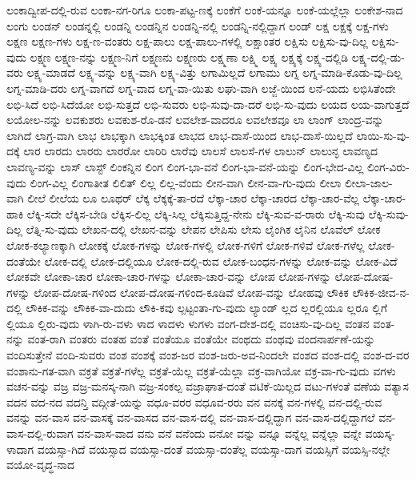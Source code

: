 {ಲಂಕಾದ್ವೀಪ-ದಲ್ಲಿ-ರುವ
ಲಂಕಾ-ನಗ-ರಿಗೂ
ಲಂಕಾ-ಪಟ್ಟ-ಣಕ್ಕೆ
ಲಂಕೆಗೆ
ಲಂಕೆ-ಯನ್ನೂ
ಲಂಕೆ-ಯಲ್ಲೆಲ್ಲಾ
ಲಂಕೇಶ-ನಾದ
ಲಂಗು
ಲಂಡನ್
ಲಂಡನ್ನಲ್ಲಿ
ಲಂಡನ್ನಿ
ಲಂಡನ್ನಿನ
ಲಂಡನ್ನಿ-ನಲ್ಲಿ
ಲಂಡನ್ನಿ-ನಲ್ಲಿದ್ದಾಗ
ಲಂಡ್
ಲಕ್ಷ
ಲಕ್ಷಕ್ಕೆ
ಲಕ್ಷ-ಗಳು
ಲಕ್ಷಣ
ಲಕ್ಷಣ-ಗಳು
ಲಕ್ಷ-ಣ-ವಂತರು
ಲಕ್ಷ-ಪಾಲು
ಲಕ್ಷ-ಪಾಲು-ಗಳಲ್ಲಿ
ಲಕ್ಷಾಂತರ
ಲಕ್ಷಿಸು
ಲಕ್ಷಿಸು-ವು-ದಿಲ್ಲ
ಲಕ್ಷಿಸು-ವುದು
ಲಕ್ಷ್ಮಣ
ಲಕ್ಷ್ಮಣ-ನನ್ನು
ಲಕ್ಷ್ಮಣ-ನಿಗೆ
ಲಕ್ಷ್ಮಣನು
ಲಕ್ಷ್ಮಣರು
ಲಕ್ಷ್ಮಣಾ
ಲಕ್ಷ್ಮಿ
ಲಕ್ಷ್ಯ
ಲಕ್ಷ್ಯಕ್ಕೆ
ಲಕ್ಷ್ಯ-ದಲ್ಲಿಡಿ
ಲಕ್ಷ್ಯ-ದಲ್ಲಿ-ಡು-ವರು
ಲಕ್ಷ್ಯ-ಮಾಡದೆ
ಲಕ್ಷ್ಯ-ವನ್ನು
ಲಕ್ಷ್ಯ-ವಾಗಿ
ಲಕ್ಷ್ಯ-ವಿತ್ತು
ಲಗಾಮಿಲ್ಲದೆ
ಲಗಾಮು
ಲಗ್ನ
ಲಗ್ನ-ಮಾಡಿ-ಕೊಡು-ವು-ದಿಲ್ಲ
ಲಗ್ನ-ಮಾಡಿ-ದರು
ಲಗ್ನ-ವಾಗದೆ
ಲಗ್ನ-ವಾದ
ಲಗ್ನ-ವಾ-ಯಿತು
ಲಘು-ವಾಗಿ
ಲಜ್ಜೆ-ಯಿಂದ
ಲನೆ-ಯದು
ಲಭಿಸಿತೆಂದೇ
ಲಭಿ-ಸಿದೆ
ಲಭಿ-ಸಿದೆಯೋ
ಲಭಿ-ಸುತ್ತದೆ
ಲಭಿ-ಸುವರು
ಲಭಿ-ಸುವು-ದಾ-ದರೆ
ಲಭಿ-ಸು-ವುದು
ಲಯದ
ಲಯ-ವಾಗುತ್ತದೆ
ಲಯೋಲ-ನನ್ನು
ಲವಕುಶರು
ಲವಕುಶ-ರೊ-ಡನೆ
ಲವಲೇಶ-ವಾದರೂ
ಲವಲೇಶವೂ
ಲಾ
ಲಾಂಗ್
ಲಾಂದ್ರ-ವನ್ನು
ಲಾಗಿದೆ
ಲಾಗ್ರ-ವಾಗಿ
ಲಾಭ
ಲಾಭಕ್ಕಾಗಿ
ಲಾಭಕ್ಕಿಂತ
ಲಾಭದ
ಲಾಭ-ದಾಸೆ-ಯಿಂದ
ಲಾಭ-ದಾಸೆ-ಯಿಲ್ಲದೆ
ಲಾಯಿ-ಸು-ವು-ದಕ್ಕೆ
ಲಾರ
ಲಾರದು
ಲಾರರು
ಲಾರರೋ
ಲಾರಿರಿ
ಲಾರೆವು
ಲಾಲಸೆ
ಲಾಲಸೆ-ಗಳ
ಲಾಲುನ್
ಲಾಲುನ್ಳ
ಲಾವಣ್ಯದ
ಲಾವಣ್ಯ-ವನ್ನು
ಲಾಸ್
ಲಾಸ್ಟ್
ಲಿಂಕನ್ನಿನ
ಲಿಂಗ
ಲಿಂಗ-ಭಾ-ವನೆ
ಲಿಂಗ-ಭಾ-ವನೆ-ಯನ್ನು
ಲಿಂಗ-ಭೇದ-ವಿಲ್ಲ
ಲಿಂಗ-ವಿರು-ವುದು
ಲಿಂಗ-ವಿಲ್ಲ
ಲಿಂಗಾತೀತ
ಲಿಲಿತ್
ಲಿಲ್ಲ
ಲಿಲ್ಲ-ವೆಂದು
ಲೀನ-ವಾಗಿ
ಲೀನ-ವಾ-ಗು-ವುದು
ಲೀಲಾ
ಲೀಲಾ-ಜಾಲ-ವಾಗಿ
ಲೀಲೆ
ಲೀಲೆಯ
ಲೂ
ಲೂಥರ್
ಲೆಕ್ಕ
ಲೆಕ್ಕಕ್ಕೆ-ತಾ-ರದೆ
ಲೆಕ್ಕಾ-ಚಾರ
ಲೆಕ್ಕಾ-ಚಾರದ
ಲೆಕ್ಕಾ-ಚಾರ-ವೆಲ್ಲ
ಲೆಕ್ಕಾ-ಚಾರ-ಹಾಕಿ
ಲೆಕ್ಕಿ-ಸದೇ
ಲೆಕ್ಕಿಸ-ಬೇಡಿ
ಲೆಕ್ಕಿಸ-ಲಿಲ್ಲ
ಲೆಕ್ಕಿ-ಸಿಲ್ಲ
ಲೆಕ್ಕಿಸುತ್ತಿದ್ದ-ನೇನು
ಲೆಕ್ಕಿ-ಸುವ-ವ-ರಾರು
ಲೆಕ್ಕಿ-ಸುವು
ಲೆಕ್ಕಿ-ಸುವು-ದಿಲ್ಲ
ಲೆತ್ನಿ-ಸು-ವುದು
ಲೇಖನ-ದಲ್ಲಿ
ಲೇಖನ-ವನ್ನು
ಲೇಪನ
ಲೇಪಿಸು
ಲೇಸು
ಲೈಂಗಿಕ
ಲೈನಿನ
ಲೊವೆಲ್
ಲೋಕ
ಲೋಕ-ಕಲ್ಯಾಣಕ್ಕಾಗಿ
ಲೋಕಕ್ಕೆ
ಲೋಕ-ಗಳನ್ನು
ಲೋಕ-ಗಳಲ್ಲಿ
ಲೋಕ-ಗಳಿಗೆ
ಲೋಕ-ಗಳಿವೆ
ಲೋಕ-ಗಳೆಲ್ಲ
ಲೋಕ-ದಂತೆಯೇ
ಲೋಕ-ದಲ್ಲಿ
ಲೋಕ-ದಲ್ಲಿಯೂ
ಲೋಕ-ದಲ್ಲಿ-ರುವ
ಲೋಕ-ಬಂಧನ-ಗಳನ್ನು
ಲೋಕ-ವನ್ನು
ಲೋಕ-ವಿದೆ
ಲೋಕವೇ
ಲೋಕಾ-ಚಾರ
ಲೋಕಾ-ಚಾರ-ಗಳನ್ನು
ಲೋಕಾ-ಚಾರ-ವನ್ನು
ಲೋಪ
ಲೋಪ-ಗಳನ್ನು
ಲೋಪ-ದೋಷ-ಗಳನ್ನು
ಲೋಪ-ದೋಷ-ಗಳಿಂದ
ಲೋಪ-ದೋಷ-ಗಳಿಂದ-ಕೂಡಿವೆ
ಲೋಪ-ವನ್ನು
ಲೋಹವು
ಲೌಕಿಕ
ಲೌಕಿಕ-ಜೀವ-ನ-ದಲ್ಲಿ
ಲೌಕಿಕ-ವನ್ನು
ಲೌಕಿಕ-ವಾ-ದುದು
ಲೌಕಿ-ಕವು
ಲ್ಪಟ್ಟಂತಾ-ಗು-ವುದು
ಲ್ಯಾಂಡ್
ಲ್ಲದ
ಲ್ಲರಲ್ಲಿಯೂ
ಲ್ಲರೂ
ಲ್ಲಿಗೆ
ಲ್ಲಿಯೂ
ಲ್ಲಿರು-ವುದು
ಳಾಗಿ-ರು-ವಳು
ಳಾದ
ಳಾದಳು
ಳುಗಳು
ವಂಗ-ದೇಶ-ದಲ್ಲಿ
ವಂಚಿಸು-ವು-ದಿಲ್ಲ
ವಂತನ
ವಂತ-ನನ್ನು
ವಂತ-ರಾಗಿ
ವಂತರು
ವಂತಹ
ವಂತೆ
ವಂತೆಯೂ
ವಂತೆಯೇ
ವಂಥದು
ವಂಥವು
ವಂದನಾರ್ಪಣೆ-ಯನ್ನು
ವಂದಿಸುತ್ತೇನೆ
ವಂದಿ-ಸುವರು
ವಂಶ
ವಂಶಕ್ಕೆ
ವಂಶ-ಜರ
ವಂಶ-ಜರು-ಅವ-ನಿಂದಲೇ
ವಂಶದ
ವಂಶ-ದಲ್ಲಿ
ವಂಶ-ದ-ವರ
ವಂಶಾನು-ಗತ-ವಾಗಿ
ವಕ್ರತೆ
ವಕ್ರತೆ-ಗಳೆಲ್ಲ
ವಕ್ರತೆ-ಯೆಲ್ಲ
ವಕ್ರತೆ-ಯೆಲ್ಲಾ
ವಕ್ರ-ವಾಗಿಯೋ
ವಕ್ರ-ವಾ-ಗು-ವುದು
ವಗಳು
ವಚನ-ವನ್ನು
ವಜ್ರ
ವಜ್ರ-ಮನಸ್ಕ-ನಾಗಿ
ವಜ್ರ-ಸಂಕಲ್ಪ
ವಜ್ರಾಘಾತ-ದಂತೆ
ವಟಿಕೆ-ಯಿಲ್ಲದ
ವಟು-ಗಳಂತೆ
ವಣೆಯ
ವತ್ಯಾಸ
ವದನ
ವದ-ನದ
ವದನ್ತಿ
ವದ್ಗೀತೆ-ಯನ್ನು
ವಧೂ-ವರರ
ವಧೂವ-ರರು
ವನ
ವನಕ್ಕೆ
ವನ-ಗಳಲ್ಲಿ
ವನ-ದಲ್ಲಿ-ರುವ
ವನನ್ನು
ವನ-ವಾಸ
ವನ-ವಾಸಕ್ಕೆ
ವನ-ವಾಸದ
ವನ-ವಾಸ-ದಲ್ಲಿ
ವನ-ವಾಸ-ದಲ್ಲಿದ್ದಾಗ
ವನ-ವಾಸ-ದಲ್ಲಿದ್ದಾಗಲೆ
ವನ-ವಾಸ-ದಲ್ಲಿ-ರುವಾಗ
ವನ-ವಾಸ-ವಾದ
ವನು
ವನೆ
ವನೆಂದು
ವನೋ
ವನ್ನು
ವನ್ನೂ
ವನ್ನೆಲ್ಲ
ವನ್ನೆಲ್ಲಾ
ವನ್ನೇ
ವಯಸ್ಕ-ಳಾದಾಗ
ವಯಸ್ಸಾ-ಗಿದೆ
ವಯಸ್ಸಾದ
ವಯಸ್ಸಾ-ದಂತೆ
ವಯಸ್ಸಾ-ದಂತೆಲ್ಲ
ವಯಸ್ಸಾ-ದಾಗ
ವಯಸ್ಸಿಗೆ
ವಯಸ್ಸಿ-ನಲ್ಲೇ
ವಯೋ-ವೃದ್ಧ-ನಾದ
}
